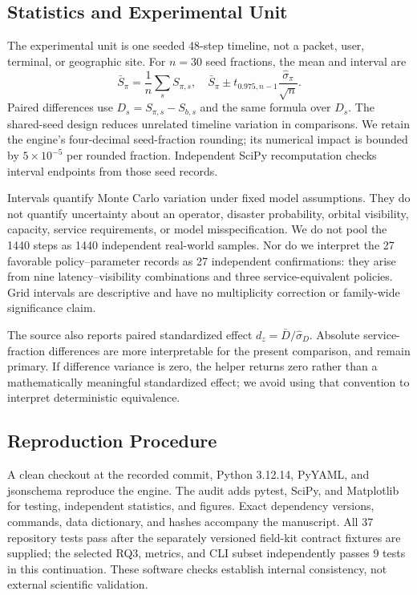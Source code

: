 \documentclass{IEEEoj}
\begin{document}
\subsection{Statistics and Experimental Unit}
The experimental unit is one seeded 48-step timeline, not a packet, user, terminal, or geographic site. For $n=30$ seed fractions, the mean and interval are
\begin{equation}
 \bar S_\pi=\frac1n\sum_s S_{\pi,s},\quad
 \bar S_\pi\pm t_{0.975,n-1}\frac{\hat\sigma_\pi}{\sqrt n}.
\end{equation}
Paired differences use $D_s=S_{\pi,s}-S_{b,s}$ and the same formula over $D_s$. The shared-seed design reduces unrelated timeline variation in comparisons. We retain the engine's four-decimal seed-fraction rounding; its numerical impact is bounded by $5\times10^{-5}$ per rounded fraction. Independent SciPy recomputation checks interval endpoints from those seed records.

Intervals quantify Monte Carlo variation under fixed model assumptions. They do not quantify uncertainty about an operator, disaster probability, orbital visibility, capacity, service requirements, or model misspecification. We do not pool the 1440 steps as 1440 independent real-world samples. Nor do we interpret the 27 favorable policy--parameter records as 27 independent confirmations: they arise from nine latency--visibility combinations and three service-equivalent policies. Grid intervals are descriptive and have no multiplicity correction or family-wide significance claim.

The source also reports paired standardized effect $d_z=\bar D/\hat\sigma_D$. Absolute service-fraction differences are more interpretable for the present comparison, and remain primary. If difference variance is zero, the helper returns zero rather than a mathematically meaningful standardized effect; we avoid using that convention to interpret deterministic equivalence.

\subsection{Reproduction Procedure}
A clean checkout at the recorded commit, Python 3.12.14, PyYAML, and jsonschema reproduce the engine. The audit adds pytest, SciPy, and Matplotlib for testing, independent statistics, and figures. Exact dependency versions, commands, data dictionary, and hashes accompany the manuscript. All 37 repository tests pass after the separately versioned field-kit contract fixtures are supplied; the selected RQ3, metrics, and CLI subset independently passes 9 tests in this continuation. These software checks establish internal consistency, not external scientific validation.
\end{document}
